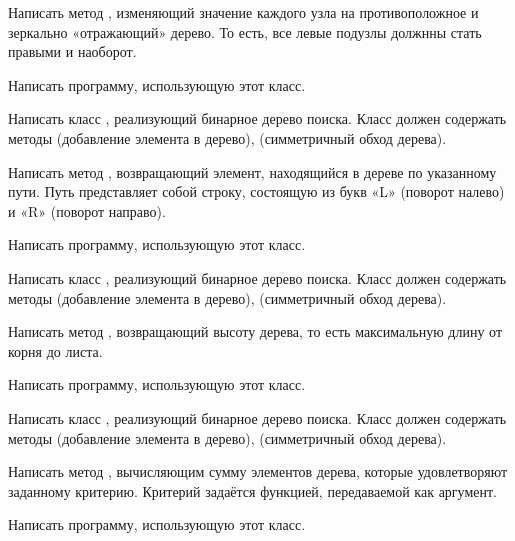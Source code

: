 Написать метод , изменяющий значение каждого узла на
противоположное и зеркально «отражающий» дерево. То есть, все
левые подузлы должнны стать правыми и наоборот.

Написать программу, использующую этот класс.

\task Написать класс , реализующий бинарное дерево
поиска. Класс должен содержать методы  (добавление элемента в
дерево),  (симметричный обход дерева).

Написать метод , возвращающий элемент, находящийся в
дереве по указанному пути. Путь представляет собой
строку, состоящую из букв «L» (поворот налево) и «R» (поворот
направо).

Написать программу, использующую этот класс.

\task Написать класс , реализующий бинарное дерево
поиска. Класс должен содержать методы  (добавление элемента в
дерево),  (симметричный обход дерева).

Написать метод , возвращающий высоту дерева, то есть
максимальную длину от корня до листа.

Написать программу, использующую этот класс.

\task Написать класс , реализующий бинарное дерево
поиска. Класс должен содержать методы  (добавление элемента в
дерево),  (симметричный обход дерева).

Написать метод , вычисляющим сумму элементов дерева, которые
удовлетворяют заданному критерию. Критерий задаётся функцией,
передаваемой как аргумент.

Написать программу, использующую этот класс.
